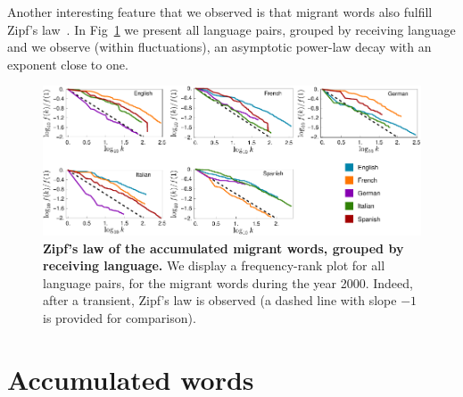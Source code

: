 \documentclass[10pt,letterpaper]{article} %
\begin{document}
Another interesting feature that we observed is that migrant words also fulfill Zipf's law~\cite{Zipf}. In Fig~\ref{fig.ZL_receiving} we present all language pairs, grouped by receiving language and we observe (within fluctuations), an asymptotic power-law decay with an exponent close to one. 





\begin{figure}[!h]
	\begin{adjustwidth}{-2cm}{1cm}
		\centering
		\includegraphics{images/zipfFinal.pdf}
		\caption{{\bf Zipf's law of the accumulated migrant words,
grouped by receiving language.} We display a frequency-rank 
plot for all language pairs, for the migrant words during the year 2000.
Indeed, after a transient, Zipf's law is observed (a dashed line with slope $-1$ is
provided for comparison). }
		\label{fig.ZL_receiving}
	\end{adjustwidth}
\end{figure}

\section*{Accumulated words} %
\end{document}
